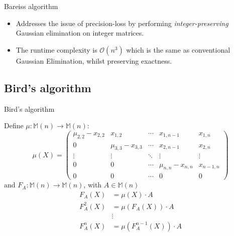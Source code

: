 \documentclass{beamer}
\begin{document}
\begin{frame}{Bareiss algorithm}

    \begin{itemize}

        \item Addresses the issue of precision-loss by performing \emph{integer-preserving}
            Gaussian elimination on integer matrices.

        \item The runtime complexity is $\mathcal{O}(n^3)$ which is the same as conventional
            Gaussian Elimination, whilst preserving exactness.


    \end{itemize}


\end{frame}

\subsection{Bird's algorithm}

\begin{frame}{Bird's algorithm}

    Define $\mu : \mathbb{M}(n) \to \mathbb{M}(n)$:
    \[
        \mu(X) =
        \begin{pmatrix}{}
            \mu_{2,2} - x_{2,2} & x_{1,2}             & \cdots & x_{1,n-1}           & x_{1,n} \\
            0                   & \mu_{3,3} - x_{3,3} & \cdots & x_{2,n-1}           & x_{2,n} \\
            \vdots              & \vdots              & \ddots & \vdots              & \vdots \\
            0                   & 0                   & \cdots & \mu_{n,n} - x_{n,n} & x_{n-1,n} \\
            0                   & 0                   & \cdots & 0                   & 0
        \end{pmatrix}
    \]
    and $F_A : \mathbb{M}(n) \to \mathbb{M}(n)$,
    with $A \in \mathbb{M}(n)$
    \begin{align*}{}
        F_A(X)    & = \mu(X)\cdot A \\
        F_A^2(X)  & = \mu(F_A(X)) \cdot A \\
                  & \vdots \\
        F_A^n(X)  & = \mu(F_A^{n-1}(X)) \cdot A \\
    \end{align*}

\end{frame}
\end{document}
